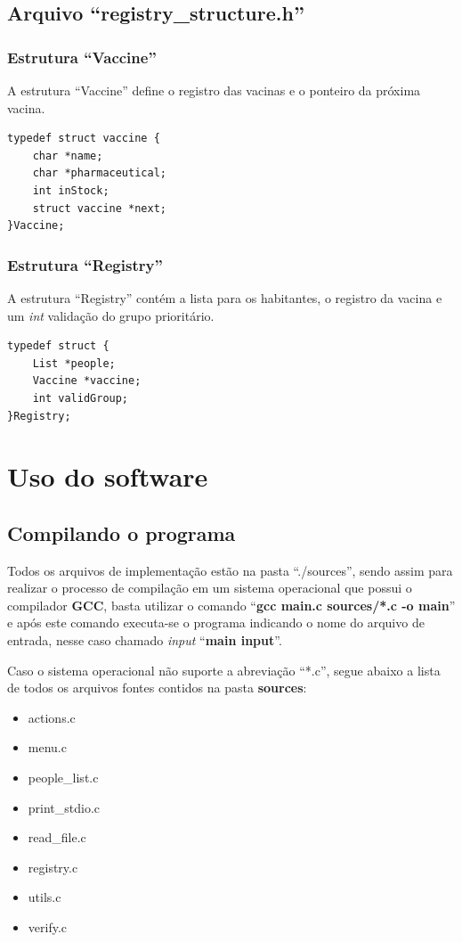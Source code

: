 \documentclass[12pt, a4paper]{article}
\begin{document}
\subsection{Arquivo ``registry\_structure.h''}\label{Arquivo ``registry''}
\subsubsection{Estrutura ``Vaccine''}\label{Estrutura ``Vaccine''}
A estrutura ``Vaccine'' define o registro das vacinas e o ponteiro da próxima vacina.
\begin{lstlisting}
typedef struct vaccine {
    char *name;
    char *pharmaceutical;
    int inStock;
    struct vaccine *next;
}Vaccine;
\end{lstlisting}
\subsubsection{Estrutura ``Registry''}\label{Estrutura ``Registry''}
A estrutura ``Registry'' contém a lista para os habitantes, o registro da vacina e um \textit{int} validação do grupo prioritário.
\begin{lstlisting}
typedef struct {
    List *people;
    Vaccine *vaccine;
    int validGroup;
}Registry;
\end{lstlisting}
\cleardoublepage
\section{Uso do software}\label{Uso do software}
\subsection{Compilando o programa}\label{Compilando o proograma}
Todos os arquivos de implementação estão na pasta ``./sources'', sendo assim para realizar o processo de compilação em um sistema operacional que possui o compilador \textbf{GCC}, basta utilizar o comando ``\textbf{gcc main.c sources/*.c -o main}'' e após este comando executa-se o programa indicando o nome do arquivo de entrada, nesse caso chamado \textit{input} ``\textbf{main input}''.

Caso o sistema operacional não suporte a abreviação ``*.c'', segue abaixo a lista de todos os arquivos fontes contidos na pasta \textbf{sources}:
\begin{itemize}
    \item actions.c
    \item menu.c
    \item people\_list.c
    \item print\_stdio.c
    \item read\_file.c
    \item registry.c
    \item utils.c
    \item verify.c
\end{itemize}
\end{document}
